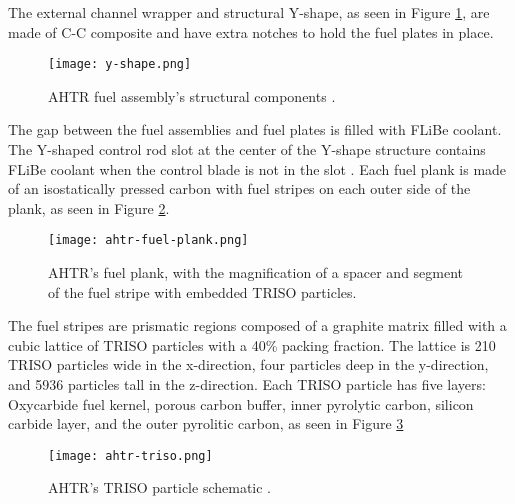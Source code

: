 The external channel wrapper and structural Y-shape, as seen in Figure 
\ref{fig:y-shape}, are made of C-C composite and have extra notches to hold 
the fuel plates in place.
\begin{figure}[]
    \centering
    \texttt{[image: y-shape.png]} 
    \caption{\acrlong{AHTR} fuel assembly's structural components 
    \cite{noauthor_fluoride_nodate}.}
    \label{fig:y-shape}
\end{figure}
The gap between the fuel assemblies and fuel plates is filled with \gls{FLiBe}
coolant. 
The Y-shaped control rod slot at the center of the Y-shape structure contains 
\gls{FLiBe} coolant when the control blade is not in the slot
\cite{varma_ahtr_2012,ramey_monte_2018,noauthor_fluoride_nodate}.
Each fuel plank is made of an isostatically pressed carbon with fuel stripes 
on each outer side of the plank, as seen in Figure \ref{fig:ahtr-fuel-plank}. 
\begin{figure}[]
    \centering
    \texttt{[image: ahtr-fuel-plank.png]} 
    \caption{\acrlong{AHTR}'s fuel plank, with the magnification of 
    a spacer and segment of the fuel stripe with embedded TRISO particles.}
    \label{fig:ahtr-fuel-plank}
\end{figure}
The fuel stripes are prismatic regions composed of a graphite matrix filled with 
a cubic lattice of \gls{TRISO} particles with a 40\% packing fraction. 
The lattice is 210 \gls{TRISO} particles wide in the x-direction, four particles 
deep in the y-direction, and 5936 particles tall in the z-direction. 
Each \gls{TRISO} particle has five layers: Oxycarbide fuel kernel, porous carbon 
buffer, inner pyrolytic carbon, silicon carbide layer, and the outer pyrolitic 
carbon, as seen in Figure \ref{fig:ahtr-triso}
\begin{figure}[]
    \centering
    \texttt{[image: ahtr-triso.png]} 
    \caption{\acrlong{AHTR}'s TRISO particle schematic \cite{noauthor_fluoride_nodate}.}
    \label{fig:ahtr-triso}
\end{figure}

